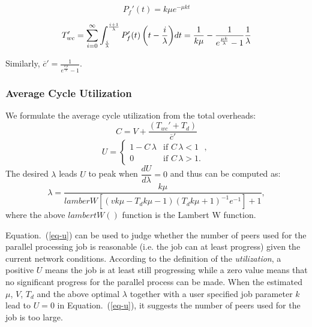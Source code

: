 \documentclass[times, 12pt, onecolumn]{article}
\newcommand{\refeq}[1]{Equation.~(\ref{#1})}
\begin{document}
\begin{equation}
P_{f}'(t)=k \mu e^{- \mu k t}
\label{eq-pfm}
\end{equation}
  
\begin{equation}
T_{wc}'=\sum_{i=0}^\infty{
\int_{\frac{i}{\lambda}}^{\frac{i+1}{\lambda}}{P_f'(t) \left(t-\frac{i}{\lambda}\right)} dt} 
=\frac{1}{k \mu}-\frac{1}{e^{\frac{\mu k}{\lambda}}-1} \frac{1}{\lambda} \\
\end{equation}

Similarly, $\overline{c}'=\frac{1}{e^{\frac{k\,\mu}{\lambda}}-1}$.

\subsubsection{Average Cycle Utilization}

We formulate the average cycle utilization from the total overheads: 
\begin{equation}
C=V+\frac{\left(T_{wc}'+T_d\right)}{\overline{c}'}
\end{equation}
\begin{equation}
U=\begin{cases}
1-C\,\lambda & \text{if $C\,\lambda<1$ },\\
0& \text{if $C\,\lambda>1$.}
\end{cases}
\label{eq-u}
\end{equation}
The desired $\lambda$ leads $U$ to peak when $\dfrac{dU}{d\lambda}=0$ and thus can be computed as:
\begin{equation*}
\lambda=\frac{k \mu}{lamberW\left[\left(v k \mu- T_d k \mu - 1\right)\left(T_d k \mu+1\right)^{-1} e^{-1}\right]+1},
\end{equation*}
where the above $lambertW\left(\right)$ function is the Lambert W function. 

\refeq{eq-u} can be used to judge whether the number of peers used
for the parallel processing job is reasonable (i.e. the job can at least
progress) given the current network conditions. According to the definition of
the \emph{utilization}, a positive $U$ means the job is at least still
progressing while a zero value means that no significant progress for the parallel process
can be made. When the estimated $\mu$, $V$, $T_d$ and the above optimal
$\lambda$ together with a user specified job parameter $k$ lead to $U=0$ in
\refeq{eq-u}, it suggests the number of peers used for the job is too large. 
\end{document}
